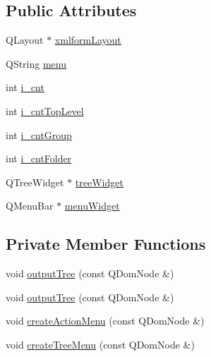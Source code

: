 \subsection*{Public Attributes}
\begin{DoxyCompactItemize}
\item 
QLayout $\ast$ \hyperlink{classXML2Menu_a17579d47fd587b9f197bd8c8fc41e454}{xmlformLayout}
\item 
QString \hyperlink{classXML2Menu_a5d7d43cf678fa24fb1d41cdd046386c5}{menu}
\item 
int \hyperlink{classXML2Menu_a2ac418439899de73ea514d1077857585}{i\_\-cnt}
\item 
int \hyperlink{classXML2Menu_aef8a9bf7f7392284a21ff6d32172fb0a}{i\_\-cntTopLevel}
\item 
int \hyperlink{classXML2Menu_ab96b42cd1ca2941ad73f3d495f25f5c5}{i\_\-cntGroup}
\item 
int \hyperlink{classXML2Menu_aa957ed5b40c6254bb990cd385777ed49}{i\_\-cntFolder}
\item 
QTreeWidget $\ast$ \hyperlink{classXML2Menu_ad45f71995bccb3f741be0e66e53b853d}{treeWidget}
\item 
QMenuBar $\ast$ \hyperlink{classXML2Menu_abb96af1c6a8aec202902250e17d1b4f8}{menuWidget}
\end{DoxyCompactItemize}
\subsection*{Private Member Functions}
\begin{DoxyCompactItemize}
\item 
void \hyperlink{classXML2Menu_a62262a3156dd7dd8820d78535e7594e7}{outputTree} (const QDomNode \&)
\item 
void \hyperlink{classXML2Menu_a62262a3156dd7dd8820d78535e7594e7}{outputTree} (const QDomNode \&)
\item 
void \hyperlink{classXML2Menu_adc7bd8f412e8d79f12fdbc39b87359c3}{createActionMenu} (const QDomNode \&)
\item 
void \hyperlink{classXML2Menu_a5bbff86c8b5c6423e61c89ab45098252}{createTreeMenu} (const QDomNode \&)
\end{DoxyCompactItemize}
